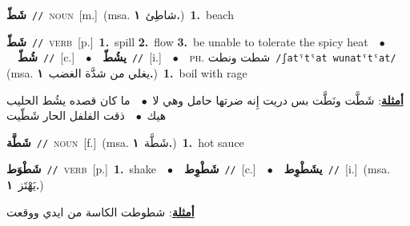 \documentclass[10pt,a4paper,twoside]{article} %
\begin{document}
\begin{multicols}{2}
{\setlength\topsep{0pt}\textbf{\foreignlanguage{arabic}{شَطّ}}\ {\color{gray}\texttt{//}\color{black}}\ \textsc{noun}\ [m.]\ \color{gray}(msa. \foreignlanguage{arabic}{شاطِئ}~\foreignlanguage{arabic}{\textbf{١.}})\color{black}\ \textbf{1.}~beach\ } \vspace{2mm}

{\setlength\topsep{0pt}\textbf{\foreignlanguage{arabic}{شَطّ}}\ {\color{gray}\texttt{//}\color{black}}\ \textsc{verb}\ [p.]\ \textbf{1.}~spill  \textbf{2.}~flow  \textbf{3.}~be unable to tolerate the spicy heat\ \ $\bullet$\ \ \setlength\topsep{0pt}\textbf{\foreignlanguage{arabic}{شُطّ}}\ {\color{gray}\texttt{//}\color{black}}\ [c.]\ \ $\bullet$\ \ \setlength\topsep{0pt}\textbf{\foreignlanguage{arabic}{يشُطّ}}\ {\color{gray}\texttt{//}\color{black}}\ [i.]\ \ $\bullet$\ \ \textsc{ph.} \color{gray} \foreignlanguage{arabic}{شطت ونطت}\color{black}\ {\color{gray}\texttt{/{\sffamily ʃatˤtˤat wunatˤtˤat}/}\color{black}}\ \color{gray} (msa. \foreignlanguage{arabic}{يغلي من شدَّة الغضب}~\foreignlanguage{arabic}{\textbf{١.}})\color{black}\ \textbf{1.}~boil with rage\  \begin{flushright}\color{gray}\foreignlanguage{arabic}{\textbf{\underline{\foreignlanguage{arabic}{أمثلة}}}: شَطَّت ونَطَّت بس دريت إِنه ضرتها حامل وهي لا\ $\bullet$\ \  ما كان قصده يشُط الحليب هيك\ $\bullet$\ \  ذقت الفلفل الحار شَطّيت}\end{flushright}\color{black}} \vspace{2mm}

{\setlength\topsep{0pt}\textbf{\foreignlanguage{arabic}{شَطَّة}}\ {\color{gray}\texttt{//}\color{black}}\ \textsc{noun}\ [f.]\ \color{gray}(msa. \foreignlanguage{arabic}{شَطَّة}~\foreignlanguage{arabic}{\textbf{١.}})\color{black}\ \textbf{1.}~hot sauce\ } \vspace{2mm}

{\setlength\topsep{0pt}\textbf{\foreignlanguage{arabic}{شَطْوَط}}\ {\color{gray}\texttt{//}\color{black}}\ \textsc{verb}\ [p.]\ \textbf{1.}~shake\ \ $\bullet$\ \ \setlength\topsep{0pt}\textbf{\foreignlanguage{arabic}{شَطْوِط}}\ {\color{gray}\texttt{//}\color{black}}\ [c.]\ \ $\bullet$\ \ \setlength\topsep{0pt}\textbf{\foreignlanguage{arabic}{يشَطْوِط}}\ {\color{gray}\texttt{//}\color{black}}\ [i.]\ \color{gray}(msa. \foreignlanguage{arabic}{يَهْتَز}~\foreignlanguage{arabic}{\textbf{١.}})\color{black}\  \begin{flushright}\color{gray}\foreignlanguage{arabic}{\textbf{\underline{\foreignlanguage{arabic}{أمثلة}}}: شطوطت الكاسة من ايدي ووقعت}\end{flushright}\color{black}} \vspace{2mm}


\end{multicols}
\end{document}
